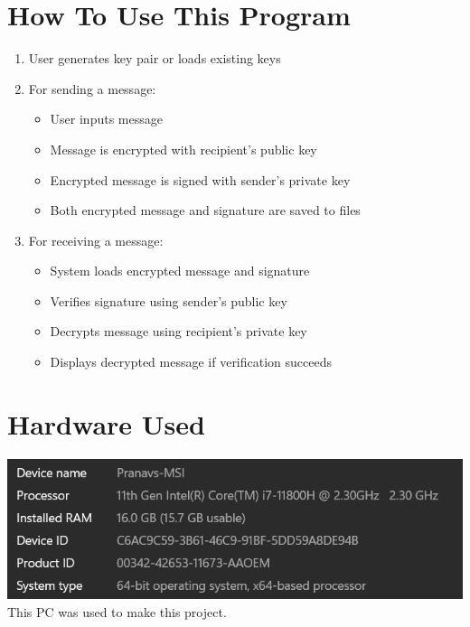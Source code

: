 \documentclass[12pt,a4paper]{report}
\begin{document}
\chapter{How To Use This Program}
\begin{enumerate}
    \item User generates key pair or loads existing keys
    \item For sending a message:
        \begin{itemize}
            \item User inputs message
            \item Message is encrypted with recipient's public key
            \item Encrypted message is signed with sender's private key
            \item Both encrypted message and signature are saved to files
        \end{itemize}
    \item For receiving a message:
        \begin{itemize}
            \item System loads encrypted message and signature
            \item Verifies signature using sender's public key
            \item Decrypts message using recipient's private key
            \item Displays decrypted message if verification succeeds
        \end{itemize}
\end{enumerate}


\chapter{Hardware Used}
\includegraphics[width=1\textwidth]{screenshot-3.png}\\[1cm]
This PC was used to make this project.
\end{document}
